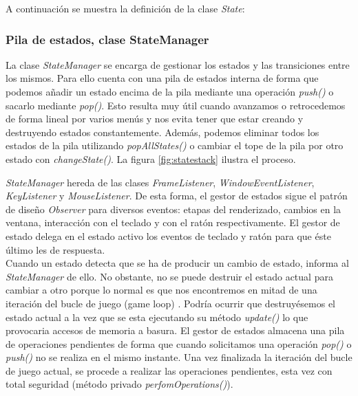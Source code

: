 A continuación se muestra la definición de la clase \textit{State}:\\



\subsubsection{Pila de estados, clase StateManager}

La clase \textit{StateManager} se encarga de gestionar los estados y las
transiciones entre los mismos. Para ello cuenta con una pila de estados
interna de forma que podemos añadir un estado encima de la pila mediante
una operación \textit{push()} o sacarlo mediante \textit{pop()}. Esto
resulta muy útil cuando avanzamos o retrocedemos de forma lineal por varios
menús y nos evita tener que estar creando y destruyendo estados constantemente.
Además, podemos eliminar todos los estados de la pila utilizando \textit{popAllStates()}
o cambiar el tope de la pila por otro estado con \textit{changeState()}.
La figura \ref{fig:statestack} ilustra el proceso.\\


\textit{StateManager} hereda de las clases \textit{FrameListener},
\textit{WindowEventListener}, \textit{KeyListener} y \textit{MouseListener}.
De esta forma, el gestor de estados sigue el patrón de diseño \textit{Observer} \cite{gamm77}
para diversos eventos: etapas del renderizado, cambios en la ventana,
interacción con el teclado y con el ratón respectivamente. El gestor de estado
delega en el estado activo los eventos de teclado y ratón para que éste último
les de respuesta.\\

Cuando un estado detecta que se ha de producir un cambio de estado, informa
al \textit{StateManager} de ello. No obstante, no se puede destruir el estado
actual para cambiar a otro porque lo normal es que nos encontremos en mitad
de una iteración del bucle de juego (game loop) \cite{greg09}. Podría
ocurrir que destruyésemos el estado actual a la vez que se esta ejecutando su
método \textit{update()} lo que provocaria accesos de memoria a basura.
El gestor de estados almacena una pila de operaciones pendientes de forma
que cuando solicitamos una operación \textit{pop()} o \textit{push()} no
se realiza en el mismo instante. Una vez finalizada la iteración del bucle
de juego actual, se procede a realizar las operaciones pendientes, esta vez
con total seguridad (método privado \textit{perfomOperations()}).\\

